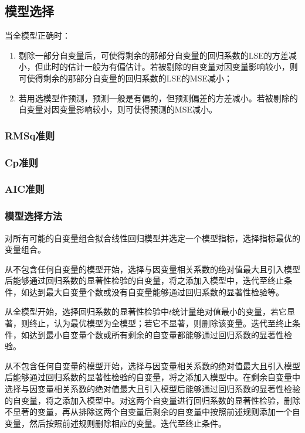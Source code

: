 \subsection{模型选择}
\begin{theorem}
	当全模型正确时：
	\begin{enumerate}
		\item 剔除一部分自变量后，可使得剩余的那部分自变量的回归系数的LSE的方差减小，但此时的估计一般为有偏估计。若被剔除的自变量对因变量影响较小，则可使得剩余的那部分自变量的回归系数的LSE的MSE减小；
		\item 若用选模型作预测，预测一般是有偏的，但预测偏差的方差减小。若被剔除的自变量对因变量影响较小，则可使得预测的MSE减小。
	\end{enumerate}
\end{theorem}
\subsubsection{RMSq准则}
\subsubsection{Cp准则}
\subsubsection{AIC准则}
\subsubsection{模型选择方法}
\begin{method}
	对所有可能的自变量组合拟合线性回归模型并选定一个模型指标，选择指标最优的变量组合。
\end{method}
\begin{method}
	从不包含任何自变量的模型开始，选择与因变量相关系数的绝对值最大且引入模型后能够通过回归系数的显著性检验的自变量，将之添加入模型中，迭代至终止条件，如达到最大自变量个数或没有自变量能够通过回归系数的显著性检验等。
\end{method}
\begin{method}
	从全模型开始，选择回归系数的显著性检验中$t$统计量绝对值最小的变量，若它显著，则终止，认为最优模型为全模型；若它不显著，则删除该变量。迭代至终止条件，如达到最小自变量个数或所有剩余的自变量都能够通过回归系数的显著性检验。
\end{method}
\begin{method}[Stepwise]
	从不包含任何自变量的模型开始，选择与因变量相关系数的绝对值最大且引入模型后能够通过回归系数的显著性检验的自变量，将之添加入模型中。在剩余自变量中选择与因变量相关系数的绝对值最大且引入模型后能够通过回归系数的显著性检验的自变量，将之添加入模型中。对这两个自变量进行回归系数的显著性检验，删除不显著的变量，再从排除这两个自变量后剩余的自变量中按照前述规则添加一个自变量，然后按照前述规则删除相应的变量。迭代至终止条件。
\end{method}

